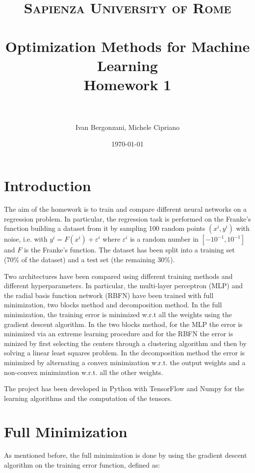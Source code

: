 \documentclass[a4paper]{article}
\title{
\normalfont \normalsize
\textsc{Sapienza University of Rome} \\ [25pt] %
\horrule{0.5pt} \\[0.4cm] %
\huge Optimization Methods for Machine Learning \\ %
\large Homework 1 \\
\horrule{2pt} \\[0.5cm] %
}
\author{Ivan Bergonzani, Michele Cipriano} %
\date{\normalsize\today} %
\numberwithin{equation}{section} %
\numberwithin{figure}{section} %
\numberwithin{table}{section} %
\theoremstyle{definition}
\begin{document}
\maketitle %


\section{Introduction}

The aim of the homework is to train and compare different neural networks on a
regression problem. In particular, the regression task is performed on the Franke's
function building a dataset from it by sampling 100 random points $(x^i, y^i)$ with noise,
i.e. with $y^i = F(x^i) + \varepsilon^i$ where $\varepsilon^i$ is a random number in
$[-10^{-1}, 10^{-1}]$ and $F$ is the Franke's function.
The dataset has been split into a training set (70\% of the dataset)
and a test set (the remaining 30\%).

Two architectures have been compared using different training methods and different
hyperparameters. In particular, the multi-layer perceptron (MLP) and the radial basis
function network (RBFN) have been trained with full minimization, two blocks method
and decomposition method. In the full minimization, the training
error is minimized w.r.t all the weights using the gradient descent algorithm.
In the two blocks method, for the MLP
the error is minimized via an extreme learning procedure and for the RBFN the
error is minized by first selecting the centers through a clustering algorithm
and then by solving a linear least squares problem. In the decomposition method
the error is minimized by alternating a convex minimization w.r.t. the output
weights and a non-convex minimization w.r.t. all the other weights.

The project has been developed in Python with TensorFlow and
Numpy for the learning algorithms and the computation of the tensors.


\section{Full Minimization}

As mentioned before, the full minimization is done by using the gradient
descent algorithm on the training error function, defined as:
\end{document}

